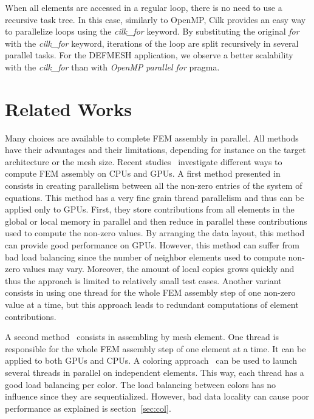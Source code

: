 \documentclass{IOS-Book-Article}
\begin{document}
When all elements are accessed in a regular loop, there is no need to use a recursive task tree.
In this case, similarly to OpenMP, Cilk provides an easy way to parallelize loops using the \emph{cilk\_for} keyword.
By substituting the original \emph{for} with the \emph{cilk\_for} keyword, iterations of the loop are split recursively in several parallel tasks.
For the DEFMESH application, we observe a better scalability with the \emph{cilk\_for} than with \emph{OpenMP parallel for} pragma.


\section{Related Works}
Many choices are available to complete FEM assembly in parallel.
All methods have their advantages and their limitations, depending for instance on the target architecture or the mesh size.
Recent studies~\cite{cecka2011assembly,CPUGPUasm} investigate different ways to compute FEM assembly on CPUs and GPUs.
A first method presented in~\cite{cecka2011assembly} consists in creating parallelism between all the non-zero entries of the system of equations.
This method has a very fine grain thread parallelism and thus can be applied only to GPUs.
First, they store contributions from all elements in the global or local memory in parallel and then reduce in parallel these contributions used to compute the non-zero values.
By arranging the data layout, this method can provide good performance on GPUs.
However, this method can suffer from bad load balancing since the number of neighbor elements used to compute non-zero values may vary.
Moreover, the amount of local copies grows quickly and thus the approach is limited to relatively small test cases.
Another variant consists in using one thread for the whole FEM assembly step of one non-zero value at a time, but this approach leads to redundant computations of element contributions.

A second method~\cite{cecka2011assembly} consists in assembling by mesh element. One thread is responsible for the whole FEM assembly step of one element at a time.
It can be applied to both GPUs and CPUs.
A coloring approach~\cite{CUDAfe,CPUfe} can be used to launch several threads in parallel on independent elements.
This way, each thread has a good load balancing per color. The load balancing between colors has no influence since they are sequentialized.
However, bad data locality can cause poor performance as explained is section~\ref{sec:col}.
\end{document}
